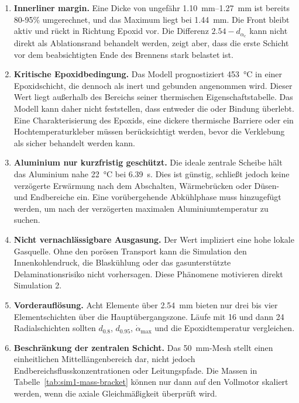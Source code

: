 \documentclass[oneside,openany]{amsdtx}
\begin{document}
\begin{enumerate}[leftmargin=2.2em,label=\textbf{\arabic*.}]
\item \textbf{Innerliner margin.} Eine Dicke von ungefähr \SIrange{1.10}{1.27}{mm} ist bereits 80-95\% umgerechnet, und das Maximum  liegt bei \SI{1.44}{mm}. Die Front bleibt aktiv und rückt in Richtung Epoxid vor. Die Differenz \(2.54-d_{\alpha_c}\) kann nicht direkt als Ablationsrand behandelt werden, zeigt aber, dass die erste Schicht vor dem beabsichtigten Ende des Brennens stark belastet ist.

\item \textbf{Kritische Epoxidbedingung.} Das Modell prognostiziert \SI{453}{\degreeCelsius} in einer Epoxidschicht, die dennoch als inert und gebunden angenommen wird. Dieser Wert liegt außerhalb des Bereichs seiner thermischen Eigenschaftstabelle. Das Modell kann daher nicht feststellen, dass entweder die  oder  Bindung überlebt. Eine Charakterisierung des Epoxids, eine dickere thermische Barriere oder ein Hochtemperaturkleber müssen berücksichtigt werden, bevor die Verklebung als sicher behandelt werden kann.

\item \textbf{Aluminium nur kurzfristig geschützt.} Die ideale zentrale Scheibe hält das Aluminium nahe \SI{22}{\degreeCelsius} bei \SI{6.39}{s}. Dies ist günstig, schließt jedoch keine verzögerte Erwärmung nach dem Abschalten, Wärmebrücken oder Düsen- und Endbereiche ein. Eine vorübergehende Abkühlphase muss hinzugefügt werden, um nach der verzögerten maximalen Aluminiumtemperatur zu suchen.

\item \textbf{Nicht vernachlässigbare Ausgasung.} Der Wert  impliziert eine hohe lokale Gasquelle. Ohne den porösen Transport kann die Simulation den Innenkohlendruck, die Blaskühlung oder das gasunterstützte Delaminationsrisiko nicht vorhersagen. Diese Phänomene motivieren direkt Simulation 2.

\item \textbf{Vorderauflösung.} Acht Elemente über \SI{2.54}{mm} bieten nur drei bis vier Elementschichten über die Hauptübergangszone. Läufe mit 16 und dann 24 Radialschichten sollten \(d_{0.8}\), \(d_{0.95}\), \(\dot\alpha_\mathrm{max}\) und die Epoxidtemperatur vergleichen.

\item \textbf{Beschränkung der zentralen Schicht.} Das \SI{50}{mm}-Mesh stellt einen einheitlichen Mittellängenbereich dar, nicht jedoch Endbereichsflusskonzentrationen oder Leitungspfade. Die Massen in Tabelle~\ref{tab:sim1-mass-bracket} können nur dann auf den Vollmotor skaliert werden, wenn die axiale Gleichmäßigkeit überprüft wird.
\end{enumerate}
\end{document}
